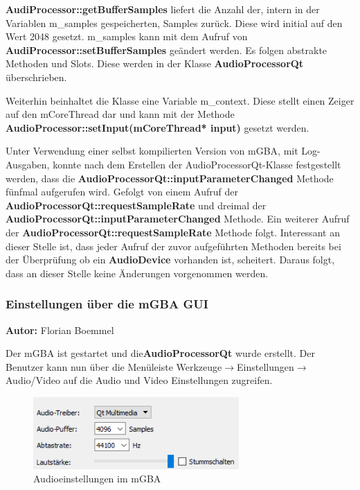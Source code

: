 \documentclass[11pt,a4paper]{scrartcl}
\newcommand{\AutorFlorian} {
    \vspace{-4mm}
    \large \textbf{Autor:} Florian Boemmel \normalsize
    \vspace{2mm}
}
\begin{document}
\textbf{AudiProcessor::getBufferSamples} liefert die Anzahl der, intern in der Variablen m\_samples gespeicherten, Samples zur\"uck. Diese wird initial auf den Wert 2048 gesetzt. m\_samples kann mit dem Aufruf von \textbf{AudiProcessor::setBufferSamples} ge\"andert werden. Es folgen abstrakte Methoden und Slots. Diese werden in der Klasse \textbf{AudioProcessorQt} \"uberschrieben.

Weiterhin beinhaltet die Klasse eine Variable m\_context. Diese stellt einen Zeiger auf den mCoreThread dar und kann mit der Methode \textbf{AudioProcessor::setInput(mCoreThread* input)} gesetzt werden. 

Unter Verwendung einer selbst kompilierten Version von mGBA, mit Log-Ausgaben, konnte nach dem Erstellen der AudioProcessorQt-Klasse festgestellt werden, dass 
die \textbf{AudioProcessorQt::inputParameterChanged} Methode f\"unfmal aufgerufen wird. Gefolgt von einem Aufruf der \textbf{AudioProcessorQt::requestSampleRate} und dreimal der \textbf{AudioProcessorQt::inputParameterChanged} Methode. Ein weiterer Aufruf der \textbf{AudioProcessorQt::requestSampleRate} Methode folgt. Interessant an dieser Stelle ist, dass jeder Aufruf der zuvor aufgef\"uhrten Methoden bereits bei der \"Uberpr\"ufung ob ein \textbf{AudioDevice} vorhanden ist, scheitert. 
Daraus folgt, dass an dieser Stelle keine \"Anderungen vorgenommen werden. %

\subsubsection{Einstellungen \"uber die mGBA GUI} \label{kapitelEinstellungenMGBA}
\AutorFlorian

Der mGBA ist gestartet und die\textbf{AudioProcessorQt} wurde erstellt. Der Benutzer kann nun \"uber die Men\"uleiste Werkzeuge$\rightarrow$Einstellungen$\rightarrow$Audio/Video auf die Audio und Video Einstellungen zugreifen.

\begin{figure}[h!]
    \centering
    \includegraphics[width=0.7\textwidth]{Audioeinstellungen}
    \caption{Audioeinstellungen im mGBA}
    \label{fig:audioeinstellungen}
\end{figure}
\end{document}
